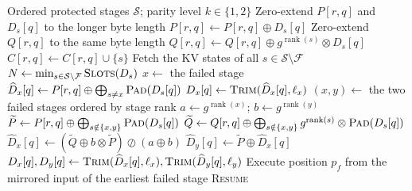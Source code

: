 \documentclass[10pt]{article}
\begin{document}
\footnotesize

\begin{algorithm}[H]
  \caption{Cross-Stage Parity Maintenance and Recovery}
  \label{alg:cross-stage-parity}
  \begin{algorithmic}[1]
    \Require Ordered protected stages $\mathcal{S}$; parity level $k\in\{1,2\}$
    \Statex {}
       \State \Return {} \EndIf
      \State Zero-extend $P[r,q]$ and $D_s[q]$ to the longer byte length
      \State $P[r,q]\gets P[r,q]\oplus D_s[q]$
        \State Zero-extend $Q[r,q]$ to the same byte length
        \State $Q[r,q]\gets Q[r,q]\oplus g^{\operatorname{rank}(s)}\otimes D_s[q]$
      \EndIf
      \State $C[r,q]\gets C[r,q]\cup\{s\}$
    \EndProcedure
    \Statex
    \Statex {}
        \State \Return {}
      \EndIf
      \State Fetch the KV states of all $s\in\mathcal{S}\setminus\mathcal{F}$
       \State \Return {} \EndIf
      \State $N\gets\min_{s\in\mathcal{S}\setminus\mathcal{F}}\Call{Slots}{D_s}$
        \State \Return {}
      \EndIf
        \State \Return {}
      \EndIf
        \State {}
      \EndFor
      \State {}
        \State $x\gets$ the failed stage
          \State $\widehat{D}_x[q]\gets P[r,q]\oplus\bigoplus_{s\neq x}\Call{Pad}{D_s[q]}$
          \State $D_x[q]\gets\Call{Trim}{\widehat{D}_x[q],\ell_x}$
        \EndFor
      \Else
        \State $(x,y)\gets$ the two failed stages ordered by stage rank
        \State $a\gets g^{\operatorname{rank}(x)}$; $b\gets g^{\operatorname{rank}(y)}$
          \State $\widetilde{P}\gets P[r,q]\oplus\bigoplus_{s\notin\{x,y\}}\Call{Pad}{D_s[q]}$
          \State $\widetilde{Q}\gets Q[r,q]\oplus\bigoplus_{s\notin\{x,y\}}g^{\operatorname{rank}(s)}\otimes\Call{Pad}{D_s[q]}$
          \State $\widehat{D}_x[q]\gets(\widetilde{Q}\oplus b\otimes\widetilde{P})\oslash(a\oplus b)$
          \State $\widehat{D}_y[q]\gets\widetilde{P}\oplus\widehat{D}_x[q]$
          \State $D_x[q],D_y[q]\gets\Call{Trim}{\widehat{D}_x[q],\ell_x},\Call{Trim}{\widehat{D}_y[q],\ell_y}$
        \EndFor
      \EndIf
        \State \Call{InstallKV}{$R(x),D_x[0{:}N)$}
      \EndFor
      \State Execute position $p_f$ from the mirrored input of the earliest failed stage
      \State \Return \textsc{Resume}
    \EndProcedure
  \end{algorithmic}
\end{algorithm}
\end{document}
